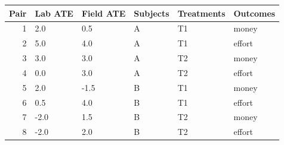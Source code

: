 
\begin{tabular}{rlllll}
\toprule
Pair & Lab ATE & Field ATE & Subjects & Treatments & Outcomes\\
\midrule
1 & 2.0 & 0.5 & A & T1 & money\\
2 & 5.0 & 4.0 & A & T1 & effort\\
3 & 3.0 & 3.0 & A & T2 & money\\
4 & 0.0 & 3.0 & A & T2 & effort\\
5 & 2.0 & -1.5 & B & T1 & money\\
6 & 0.5 & 4.0 & B & T1 & effort\\
7 & -2.0 & 1.5 & B & T2 & money\\
8 & -2.0 & 2.0 & B & T2 & effort\\
\bottomrule
\end{tabular}
